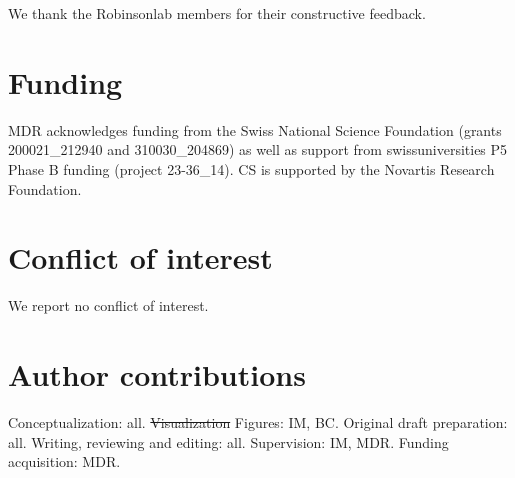 \documentclass[11pt]{article}
\begin{document}
We thank the Robinsonlab members for their constructive feedback.

{\color{red}
\section*{Funding}
MDR acknowledges funding from the Swiss National Science Foundation (grants 200021\_212940 and 310030\_204869) as well as support from swissuniversities P5 Phase B funding (project 23-36\_14). CS is supported by the Novartis Research Foundation.

\section*{Conflict of interest}

We report no conflict of interest.
}
\section*{Author contributions}

Conceptualization: all. {\color{red} \sout{Visualization} Figures: IM,} BC. Original draft preparation: all. Writing, reviewing and editing: all. Supervision: IM, MDR. Funding acquisition: MDR.



\pagebreak
\linespread{1} 

\end{document}
